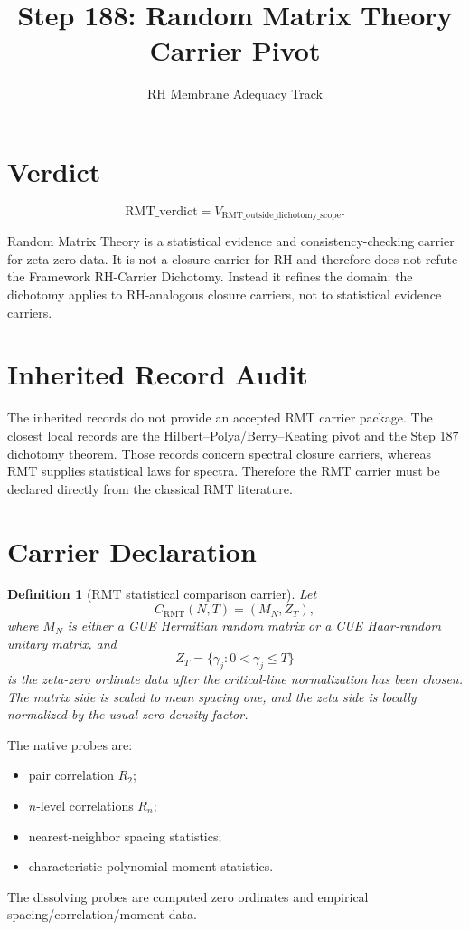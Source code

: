 \documentclass[11pt]{article}
\title{Step 188: Random Matrix Theory Carrier Pivot}
\author{RH Membrane Adequacy Track}
\date{}
\newtheorem{definition}{Definition}
\begin{document}
\maketitle

\section*{Verdict}

\[
\boxed{\mathrm{RMT\_verdict}=V_{\mathrm{RMT\_outside\_dichotomy\_scope}}.}
\]

Random Matrix Theory is a statistical evidence and consistency-checking
carrier for zeta-zero data.  It is not a closure carrier for RH and therefore
does not refute the Framework RH-Carrier Dichotomy.  Instead it refines the
domain: the dichotomy applies to RH-analogous closure carriers, not to
statistical evidence carriers.

\section*{Inherited Record Audit}

The inherited records do not provide an accepted RMT carrier package.  The
closest local records are the Hilbert--Polya/Berry--Keating pivot and the
Step 187 dichotomy theorem.  Those records concern spectral closure carriers,
whereas RMT supplies statistical laws for spectra.  Therefore the RMT carrier
must be declared directly from the classical RMT literature.

\section*{Carrier Declaration}

\begin{definition}[RMT statistical comparison carrier]
Let
\[
C_{\mathrm{RMT}}(N,T)=(M_N,Z_T),
\]
where \(M_N\) is either a GUE Hermitian random matrix or a CUE Haar-random
unitary matrix, and
\[
Z_T=\{\gamma_j:0<\gamma_j\le T\}
\]
is the zeta-zero ordinate data after the critical-line normalization has been
chosen.  The matrix side is scaled to mean spacing one, and the zeta side is
locally normalized by the usual zero-density factor.
\end{definition}

The native probes are:
\begin{itemize}
\item pair correlation \(R_2\);
\item \(n\)-level correlations \(R_n\);
\item nearest-neighbor spacing statistics;
\item characteristic-polynomial moment statistics.
\end{itemize}
The dissolving probes are computed zero ordinates and empirical
spacing/correlation/moment data.
\end{document}

